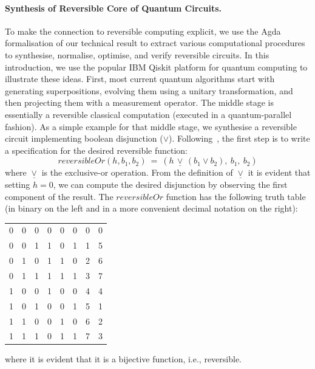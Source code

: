 \paragraph*{Synthesis of Reversible Core of Quantum Circuits.} To make the connection to reversible computing explicit,
we use the Agda formalisation of our technical result to extract various computational procedures to synthesise,
normalise, optimise, and verify reversible circuits. In this introduction, we use the popular IBM Qiskit platform for
quantum computing to illustrate these ideas. First, most current quantum algorithms start with generating
superpositions, evolving them using a unitary transformation, and then projecting them with a measurement operator. The
middle stage is essentially a reversible classical computation (executed in a quantum-parallel fashion). As a simple
example for that middle stage, we synthesise a reversible circuit implementing boolean disjunction
($\vee$). Following~\citet{Toffoli:1980}, the first step is to write a specification for the desired reversible
function:
\[
\mathit{reversibleOr}(h,b_1,b_2) ~=~ (h \,\underline{\vee}\, (b_1 \vee b_2), ~b_1, ~b_2)
\]
where $\underline{\vee}$ is the exclusive-or operation. From the definition of $\underline{\vee}$ it is evident that setting $h=0$, we can compute the desired disjunction by observing the first component of the result. The $\mathit{reversibleOr}$ function has the following truth table (in binary on the left and in a more convenient decimal notation on the right):

\begin{center}\begin{tabular}{|ccc|ccc|@{\qquad\qquad}|c|c|}
0 & 0 & 0 &     0 & 0 & 0     & 0 & 0 \\
0 & 0 & 1 &     1 & 0 & 1     & 1 & 5 \\
0 & 1 & 0 &     1 & 1 & 0    & 2 & 6 \\
0 & 1 & 1 &     1 & 1 & 1    & 3 & 7 \\
1 & 0 & 0 &     1 & 0 & 0    & 4 & 4 \\
1 & 0 & 1 &     0 & 0 & 1    & 5 & 1 \\
1 & 1 & 0 &     0 & 1 & 0    & 6 & 2 \\
1 & 1 & 1 &     0 & 1 & 1    & 7 & 3
\end{tabular}\end{center}

\noindent where it is evident that it is a bijective function, i.e., reversible.

